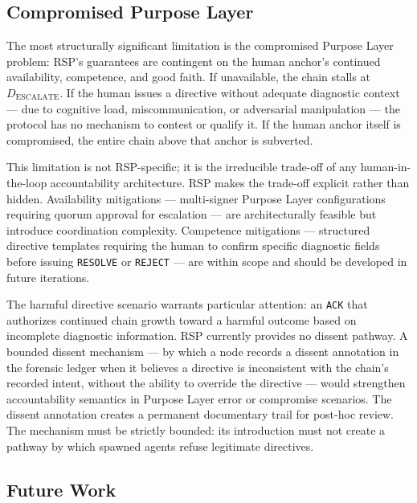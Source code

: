 \subsection{Compromised Purpose Layer}
\label{sec:rs-purpose-compromise}

The most structurally significant limitation is the compromised Purpose Layer problem: RSP's guarantees are contingent on the human anchor's continued availability, competence, and good faith. If unavailable, the chain stalls at $D_{\mathrm{ESCALATE}}$. If the human issues a directive without adequate diagnostic context — due to cognitive load, miscommunication, or adversarial manipulation — the protocol has no mechanism to contest or qualify it. If the human anchor itself is compromised, the entire chain above that anchor is subverted.

This limitation is not RSP-specific; it is the irreducible trade-off of any human-in-the-loop accountability architecture. RSP makes the trade-off explicit rather than hidden. Availability mitigations — multi-signer Purpose Layer configurations requiring quorum approval for escalation — are architecturally feasible but introduce coordination complexity. Competence mitigations — structured directive templates requiring the human to confirm specific diagnostic fields before issuing \texttt{RESOLVE} or \texttt{REJECT} — are within scope and should be developed in future iterations.

The harmful directive scenario warrants particular attention: an \texttt{ACK} that authorizes continued chain growth toward a harmful outcome based on incomplete diagnostic information. RSP currently provides no dissent pathway. A bounded dissent mechanism — by which a node records a dissent annotation in the forensic ledger when it believes a directive is inconsistent with the chain's recorded intent, without the ability to override the directive — would strengthen accountability semantics in Purpose Layer error or compromise scenarios. The dissent annotation creates a permanent documentary trail for post-hoc review. The mechanism must be strictly bounded: its introduction must not create a pathway by which spawned agents refuse legitimate directives.

\subsection{Future Work}
\label{sec:rs-future-work}

